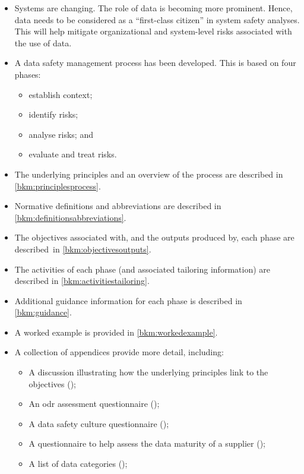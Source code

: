 \begin{itemize}
	\item Systems are changing. The role of data is becoming more prominent. Hence, data needs to be considered as a ``first-class citizen'' in system safety analyses. This will help mitigate organizational and system-level risks associated with the use of data.
	
	\item A data safety management process has been developed. This is based on four phases:
	\begin{itemize}
		\item establish context;
		\item identify risks;
		\item analyse risks; and
		\item evaluate and \gls{treat} risks.
	\end{itemize}
	\item The underlying principles and an overview of the process are described in \autoref{bkm:principlesprocess}.
	\item Normative definitions and abbreviations are described in \autoref{bkm:definitionsabbreviations}.
	\item The objectives associated with, and the outputs produced by, each phase are \cbstart described\cbend\ in \autoref{bkm:objectivesoutputs}.
	\item The activities of each phase (and associated \gls{tailoring} \gls{information}) are described in \autoref{bkm:activitiestailoring}.
	\item Additional guidance \gls{information} for each phase is described in \autoref{bkm:guidance}.
	\item A worked example is provided in \autoref{bkm:workedexample}.
	\item A collection of appendices provide more detail, including:
	\begin{itemize}
		\item A discussion illustrating how the underlying principles link to the objectives (); 
		\item An \gls{odr} assessment questionnaire ();
		\item A data safety culture questionnaire ();
		\item A questionnaire to help assess the data maturity of a supplier ();
		\item A list of data categories ();

\end{itemize}
\end{itemize}
